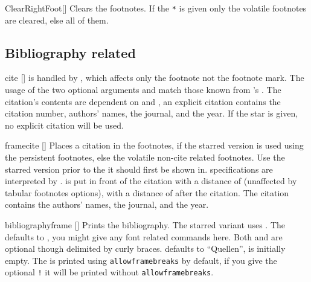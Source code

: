 \begin{describemacro}{ClearRightFoot}[\meta{*}]
  Clears the footnotes. If the \texttt{*} is given only the volatile footnotes
  are cleared, else all of them.
\end{describemacro}

\subsection{Bibliography related}
\begin{describemacro}{cite}%
  [\meta{*}]
   is handled by , which affects only the footnote not
  the footnote mark. The usage of the two optional arguments and 
  match those known from 's . The citation's contents are
  dependent on  and , an explicit
  citation contains the citation number, authors' names, the journal, and the
  year. If the star is given, no explicit citation will be used.
\end{describemacro}

\begin{describemacro}{framecite}%
  [\meta{*}]
  Places a citation in the footnotes, if the starred version is used using the
  persistent footnotes, else the volatile non-cite related footnotes. Use the
  starred version prior to the  it should first be shown in.
   specifications are interpreted by .  is
  put in front of the citation with a distance of \cs{,} (unaffected by tabular
  footnotes options),  with a distance of \cs{,} after the citation.
  The citation contains the authors' names, the journal, and the year.
\end{describemacro}

\begin{describemacro}{bibliographyframe}%
  [\meta{*}\meta{!}]
  Prints the bibliography. The starred variant uses . The
   defaults to , you might give any font related
  commands here. Both  and  are optional though
  delimited by curly braces.  defaults to \enquote{Quellen},
   is initially empty. The  is printed
  using \texttt{allowframebreaks} by default, if you give the optional
  \texttt{!} it will be printed without \texttt{allowframebreaks}.
\end{describemacro}

